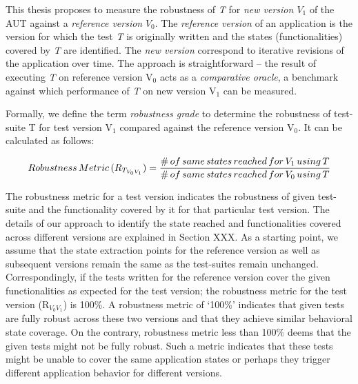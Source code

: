 This thesis proposes to measure the robustness of  \textit{T} for \textit{new version $V_{1}$} of the AUT against a \textit{reference version} \textit{$V_{0}$}. The \textit{reference version} of an application is the version for which the test \textit{T} is originally written and the states (functionalities) covered by \textit{T} are identified. The \textit{new version} correspond to iterative revisions of the application over time. The approach is straightforward -- the result of executing \textit{T} on reference version V$_{0}$ acts as a \textit{comparative oracle}, a benchmark against which performance of \textit{T} on new version V$_{1}$ can be measured. 

Formally, we define the term \textit{
robustness grade} to determine the robustness of test-suite T for test version V$_{1}$ compared against the reference version V$_{0}$. It can be calculated as follows:


$$Robustness \thinspace Metric \thinspace (R_{T_{V_{0}V_{1}}}) = \displaystyle \frac{\#\thinspace of \thinspace same \thinspace states \thinspace reached \thinspace for \thinspace V_{1} \thinspace using \thinspace T}{\# \thinspace of \thinspace same \thinspace states \thinspace reached  \thinspace for \thinspace V_{0} \thinspace using \thinspace T}\normalsize$$

The robustness metric for a test version indicates the robustness of given test-suite and the functionality covered by it for that particular test version. The details of our approach to identify the state reached and functionalities covered across different versions are explained in Section XXX. As a starting point, we assume that the state extraction points for the reference version as well as subsequent versions remain the same as the test-suites remain unchanged. Correspondingly, if the tests written for the reference version cover the given functionalities as expected for the test version; the robustness metric for the test version (R$_{V_{0}V_{1}}$) is 100\%. A robustness metric of ‘100\%’ indicates that given tests are fully robust across these two versions and that they achieve similar behavioral state coverage. On the contrary, robustness metric less than 100\% deems that the given tests might not be fully robust. Such a metric indicates that these tests might be unable to cover the same application states or perhaps they trigger different application behavior for different versions. 

